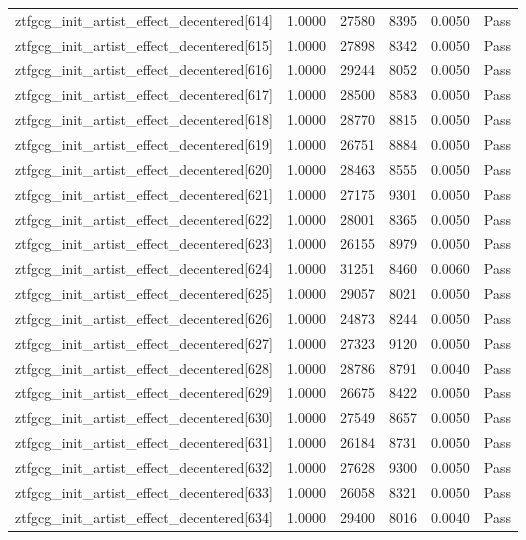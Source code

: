\begin{table}[htbp]
\begin{tabular}{llrrll}
ztfgcg\_init\_artist\_effect\_decentered[614] & 1.0000 & 27580 & 8395 & 0.0050 & Pass \\
ztfgcg\_init\_artist\_effect\_decentered[615] & 1.0000 & 27898 & 8342 & 0.0050 & Pass \\
ztfgcg\_init\_artist\_effect\_decentered[616] & 1.0000 & 29244 & 8052 & 0.0050 & Pass \\
ztfgcg\_init\_artist\_effect\_decentered[617] & 1.0000 & 28500 & 8583 & 0.0050 & Pass \\
ztfgcg\_init\_artist\_effect\_decentered[618] & 1.0000 & 28770 & 8815 & 0.0050 & Pass \\
ztfgcg\_init\_artist\_effect\_decentered[619] & 1.0000 & 26751 & 8884 & 0.0050 & Pass \\
ztfgcg\_init\_artist\_effect\_decentered[620] & 1.0000 & 28463 & 8555 & 0.0050 & Pass \\
ztfgcg\_init\_artist\_effect\_decentered[621] & 1.0000 & 27175 & 9301 & 0.0050 & Pass \\
ztfgcg\_init\_artist\_effect\_decentered[622] & 1.0000 & 28001 & 8365 & 0.0050 & Pass \\
ztfgcg\_init\_artist\_effect\_decentered[623] & 1.0000 & 26155 & 8979 & 0.0050 & Pass \\
ztfgcg\_init\_artist\_effect\_decentered[624] & 1.0000 & 31251 & 8460 & 0.0060 & Pass \\
ztfgcg\_init\_artist\_effect\_decentered[625] & 1.0000 & 29057 & 8021 & 0.0050 & Pass \\
ztfgcg\_init\_artist\_effect\_decentered[626] & 1.0000 & 24873 & 8244 & 0.0050 & Pass \\
ztfgcg\_init\_artist\_effect\_decentered[627] & 1.0000 & 27323 & 9120 & 0.0050 & Pass \\
ztfgcg\_init\_artist\_effect\_decentered[628] & 1.0000 & 28786 & 8791 & 0.0040 & Pass \\
ztfgcg\_init\_artist\_effect\_decentered[629] & 1.0000 & 26675 & 8422 & 0.0050 & Pass \\
ztfgcg\_init\_artist\_effect\_decentered[630] & 1.0000 & 27549 & 8657 & 0.0050 & Pass \\
ztfgcg\_init\_artist\_effect\_decentered[631] & 1.0000 & 26184 & 8731 & 0.0050 & Pass \\
ztfgcg\_init\_artist\_effect\_decentered[632] & 1.0000 & 27628 & 9300 & 0.0050 & Pass \\
ztfgcg\_init\_artist\_effect\_decentered[633] & 1.0000 & 26058 & 8321 & 0.0050 & Pass \\
ztfgcg\_init\_artist\_effect\_decentered[634] & 1.0000 & 29400 & 8016 & 0.0040 & Pass \\

\end{tabular}
\end{table}
